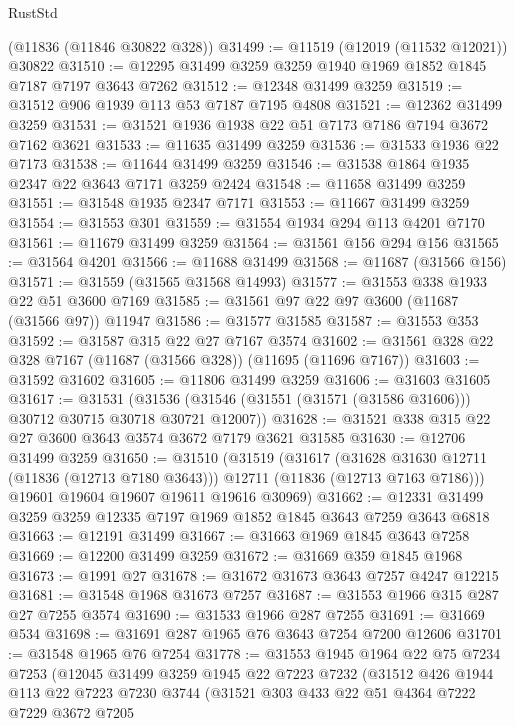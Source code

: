 \begin{lexlean}{RustStd}
\begin{coremodule}
    (@11836 (@11846 @30822 @328))
@31499 := @11519 (@12019 (@11532 @12021)) @30822
@31510 := @12295 @31499 @3259 @3259 @1940 @1969 @1852 @1845 @7187 @7197 @3643 @7262
@31512 := @12348 @31499 @3259
@31519 := @31512 @906 @1939 @113 @53 @7187 @7195 @4808
@31521 := @12362 @31499 @3259
@31531 := @31521 @1936 @1938 @22 @51 @7173 @7186 @7194 @3672 @7162 @3621
@31533 := @11635 @31499 @3259
@31536 := @31533 @1936 @22 @7173
@31538 := @11644 @31499 @3259
@31546 := @31538 @1864 @1935 @2347 @22 @3643 @7171 @3259 @2424
@31548 := @11658 @31499 @3259
@31551 := @31548 @1935 @2347 @7171
@31553 := @11667 @31499 @3259
@31554 := @31553 @301
@31559 := @31554 @1934 @294 @113 @4201 @7170
@31561 := @11679 @31499 @3259
@31564 := @31561 @156 @294 @156
@31565 := @31564 @4201
@31566 := @11688 @31499
@31568 := @11687 (@31566 @156)
@31571 := @31559 (@31565 @31568 @14993)
@31577 := @31553 @338 @1933 @22 @51 @3600 @7169
@31585 := @31561 @97 @22 @97 @3600 (@11687 (@31566 @97)) @11947
@31586 := @31577 @31585
@31587 := @31553 @353
@31592 := @31587 @315 @22 @27 @7167 @3574
@31602 := @31561 @328 @22 @328 @7167 (@11687 (@31566 @328)) (@11695 (@11696 @7167))
@31603 := @31592 @31602
@31605 := @11806 @31499 @3259
@31606 := @31603 @31605
@31617 := @31531
    (@31536 (@31546 (@31551 (@31571 (@31586 @31606))) @30712 @30715 @30718 @30721 @12007))
@31628 := @31521 @338 @315 @22 @27 @3600 @3643 @3574 @3672 @7179 @3621 @31585
@31630 := @12706 @31499 @3259
@31650 := @31510
    (@31519
      (@31617
        (@31628 @31630 @12711 (@11836 (@12713 @7180 @3643)))
        @12711
        (@11836 (@12713 @7163 @7186)))
      @19601
      @19604
      @19607
      @19611
      @19616
      @30969)
@31662 := @12331 @31499 @3259 @3259 @12335 @7197 @1969 @1852 @1845 @3643 @7259 @3643 @6818
@31663 := @12191 @31499
@31667 := @31663 @1969 @1845 @3643 @7258
@31669 := @12200 @31499 @3259
@31672 := @31669 @359 @1845 @1968
@31673 := @1991 @27
@31678 := @31672 @31673 @3643 @7257 @4247 @12215
@31681 := @31548 @1968 @31673 @7257
@31687 := @31553 @1966 @315 @287 @27 @7255 @3574
@31690 := @31533 @1966 @287 @7255
@31691 := @31669 @534
@31698 := @31691 @287 @1965 @76 @3643 @7254 @7200 @12606
@31701 := @31548 @1965 @76 @7254
@31778 := @31553
    @1945
    @1964
    @22
    @75
    @7234
    @7253
    (@12045
      @31499
      @3259
      @1945
      @22
      @7223
      @7232
      (@31512
        @426
        @1944
        @113
        @22
        @7223
        @7230
        @3744
        (@31521
          @303
          @433
          @22
          @51
          @4364
          @7222
          @7229
          @3672
          @7205

\end{coremodule}
\end{lexlean}
